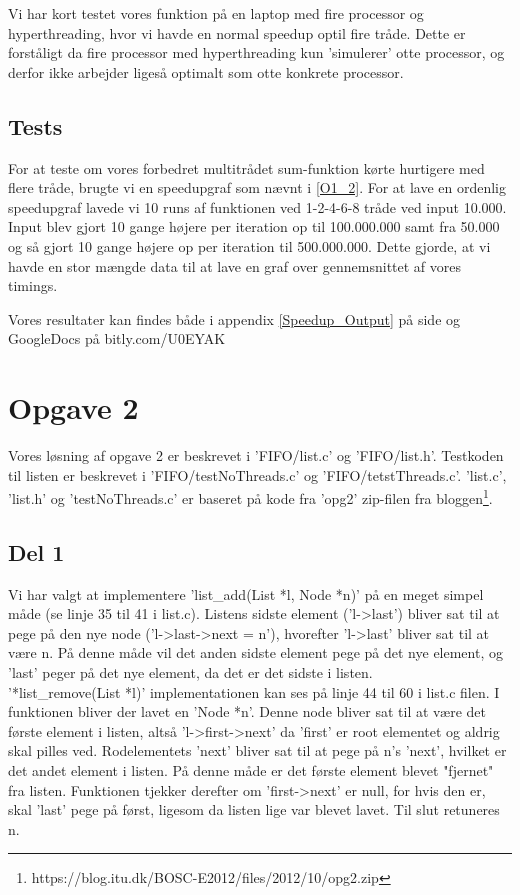 Vi har kort testet vores funktion på en laptop med fire processor og hyperthreading, hvor vi havde en normal speedup optil fire tråde. Dette er forståligt da fire processor med hyperthreading kun 'simulerer' otte processor, og derfor ikke arbejder ligeså optimalt som otte konkrete processor.

\subsection{Tests}
\label{O1_Tests}
For at teste om vores forbedret multitrådet sum-funktion kørte hurtigere med flere tråde, brugte vi en speedupgraf som nævnt i \ref{O1_2}. For at lave en ordenlig speedupgraf lavede vi 10 runs af funktionen ved 1-2-4-6-8 tråde ved input 10.000. Input blev gjort 10 gange højere per iteration op til 100.000.000 samt fra 50.000 og så gjort 10 gange højere op per iteration til 500.000.000. Dette gjorde, at vi havde en stor mængde data til at lave en graf over gennemsnittet af vores timings.

Vores resultater kan findes både i appendix \ref{Speedup_Output} på side \pageref{Speedup_Output} og GoogleDocs på bitly.com/U0EYAK

\section{Opgave 2}
\label{O2}
Vores løsning af opgave 2 er beskrevet i 'FIFO/list.c' og 'FIFO/list.h'. Testkoden til listen er beskrevet i 'FIFO/testNoThreads.c' og 'FIFO/tetstThreads.c'. 'list.c', 'list.h' og 'testNoThreads.c' er baseret på kode fra 'opg2' zip-filen fra bloggen\footnote{https://blog.itu.dk/BOSC-E2012/files/2012/10/opg2.zip}.
\subsection{Del 1}
\label{O2_1}
Vi har valgt at implementere 'list\_add(List *l, Node *n)' på en meget simpel måde (se linje 35 til 41 i list.c). Listens sidste element ('l-\textgreater last') bliver sat til at pege på den nye node ('l-\textgreater last-\textgreater next = n'), hvorefter 'l-\textgreater last' bliver sat til at være n. På denne måde vil det anden sidste element pege på det nye element, og 'last' peger på det nye element, da det er det sidste i listen.
\\'*list\_remove(List *l)' implementationen kan ses på linje 44 til 60 i list.c filen. I funktionen bliver der lavet en 'Node *n'. Denne node bliver sat til at være det første element i listen, altså 'l-\textgreater first-\textgreater next' da 'first' er root elementet og aldrig skal pilles ved. Rodelementets 'next' bliver sat til at pege på n's 'next', hvilket er det andet element i listen. På denne måde er det første element blevet "fjernet" fra listen. Funktionen tjekker derefter om 'first-\textgreater next' er null, for hvis den er, skal 'last' pege på først, ligesom da listen lige var blevet lavet. Til slut retuneres n.

